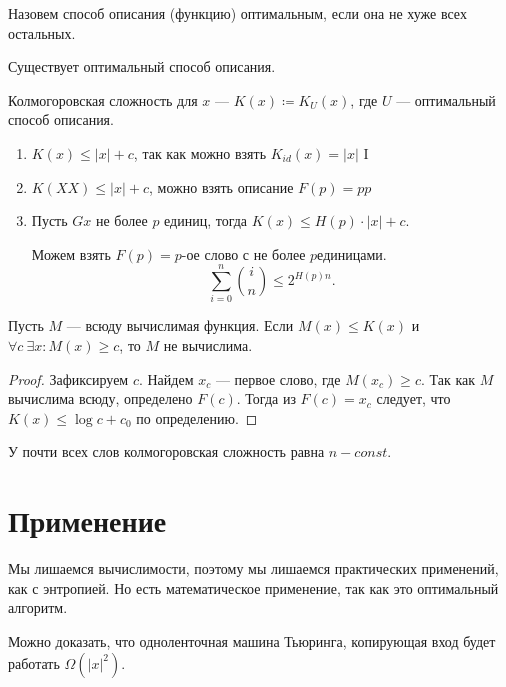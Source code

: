 Назовем способ описания (функцию) оптимальным, если она не хуже всех остальных.

\begin{thm}
    Существует оптимальный способ описания.
\end{thm}

\begin{defn}[]
	Колмогоровская сложность для $ x$ --- $ K(x) \coloneqq K_U(x)$, где $ U$ --- оптимальный способ описания.
\end{defn}
\begin{prop}
	\begin{enumerate}
		\item
	$ K(x) \le \lvert x \rvert +c$, так как можно взять $ K_{id}(x) = \lvert x \rvert $
	I
\item $ K(XX) \le \lvert x \rvert +c$, можно взять описание $ F(p) = pp$ 
\item Пусть $G x$ не более $ p$ единиц, тогда $ K(x) \le H(p) \cdot \lvert x \rvert + c$.

	Можем взять $ F(p) = p\text{-ое слово с не более } p \text{единицами}$.
	\[
		\sum_{i=0}^{n} {i \choose n} \le 2 ^{H(p) n}
	.\] 
	\end{enumerate}
\end{prop}

\begin{thm}
	Пусть $ M$ --- всюду вычислимая функция. Если $ M(x) \le K(x)$ и $ \forall c ~ \exists x \colon M(x) \ge c$, то $ M$ не вычислима.
\end{thm}
\begin{proof}
	Зафиксируем $ c$. Найдем  $ x_c$ --- первое слово, где  $ M(x_c) \ge c$. Так как $ M$ вычислима всюду, определено $ F(c)$. 
	Тогда из $ F(c) = x_c$ следует, что  $ K(x) \le  \log c + c_0$ по определению.
\end{proof}

\begin{cor}
    У почти всех слов колмогоровская сложность равна $ n- const$.
\end{cor}

\section{Применение}
Мы лишаемся вычислимости, поэтому мы лишаемся практических применений, как с энтропией. Но есть математическое применение, так как это оптимальный алгоритм.

Можно доказать, что одноленточная машина Тьюринга, копирующая вход будет работать $ \Omega( \lvert x \rvert ^2)$.

